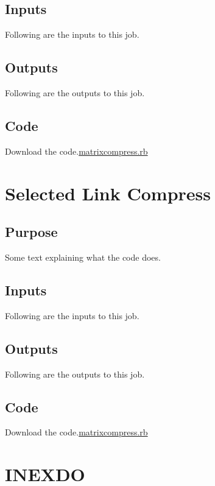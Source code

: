 \documentclass[
  letterpaper,
  DIV=11,
  numbers=noendperiod]{scrreprt}
\begin{document}
\section{Inputs}

Following are the inputs to this job.

\section{Outputs}

Following are the outputs to this job.

\section{Code}

Download the code.\href{../first.rb}{matrixcompress.rb}

\chapter{Selected Link Compress}\label{selected-link-compress}

\section{Purpose}

Some text explaining what the code does.

\section{Inputs}

Following are the inputs to this job.

\section{Outputs}

Following are the outputs to this job.

\section{Code}

Download the code.\href{../first.rb}{matrixcompress.rb}

\chapter{INEXDO}\label{inexdo}
\end{document}
